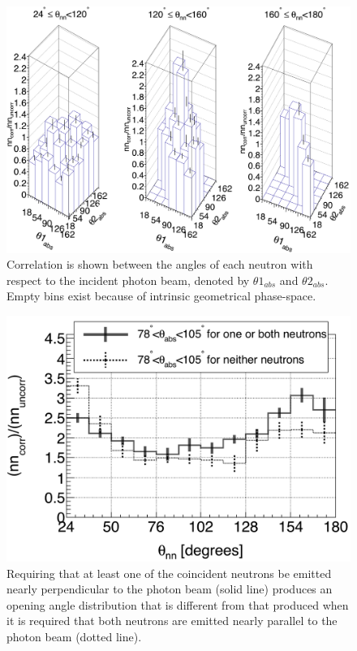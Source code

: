 \begin{figure}
    \includegraphics[width = \figsize\textwidth]{theta_abs_LEGO.png}
    \caption{Correlation is shown between the angles of each neutron with respect to the incident photon beam, denoted by $\theta 1_{abs}$ and $\theta 2_{abs}$.
    Empty bins exist because of intrinsic geometrical phase-space.}
    \label{fig:theta_abs_LEGO}
\end{figure}

\begin{figure}
\includegraphics[width=\figsize\textwidth]{theta_abs_two-neutron.png}
\caption{Requiring that at least one of the coincident neutrons be emitted nearly perpendicular to the photon beam (solid line) produces an opening angle distribution that is different from that produced when it is required that both neutrons are emitted nearly parallel to the photon beam (dotted line).}
\label{fig:theta_abs_two_neutron}
\end{figure}